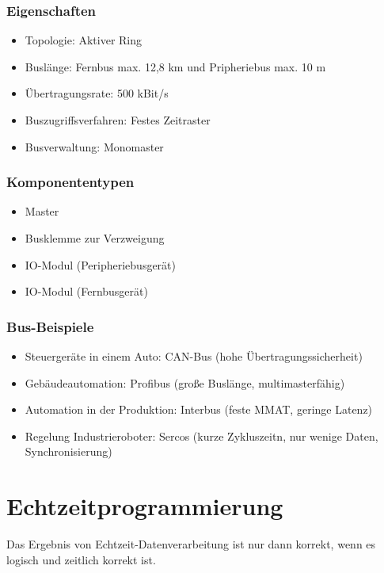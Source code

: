 \subsubsection{Eigenschaften}
\begin{itemize}
	\item Topologie: Aktiver Ring
	\item Buslänge: Fernbus max. 12,8 km und Pripheriebus max. 10 m
	\item Übertragungsrate: 500 kBit/s
	\item Buszugriffsverfahren: Festes Zeitraster
	\item Busverwaltung: Monomaster
\end{itemize}

\subsubsection{Komponententypen}
\begin{itemize}
	\item Master
	\item Busklemme zur Verzweigung
	\item IO-Modul (Peripheriebusgerät)
	\item IO-Modul (Fernbusgerät)
\end{itemize}

\subsubsection{Bus-Beispiele}
\begin{itemize}
	\item Steuergeräte in einem Auto: CAN-Bus (hohe Übertragungssicherheit)
	\item Gebäudeautomation: Profibus (große Buslänge, multimasterfähig)
	\item Automation in der Produktion: Interbus (feste MMAT, geringe Latenz)
	\item Regelung Industrieroboter: Sercos (kurze Zykluszeitn, nur wenige Daten, Synchronisierung)
\end{itemize}



\section{Echtzeitprogrammierung}
Das Ergebnis von Echtzeit-Datenverarbeitung ist nur dann korrekt, wenn es logisch und zeitlich korrekt ist.


